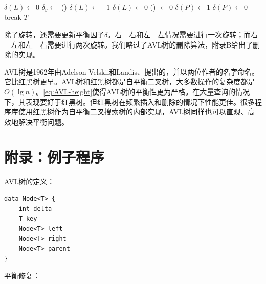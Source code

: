 \documentclass[b5paper]{ctexart}
\begin{document}
\begin{algorithmic}[1]
          \State $\delta(L) \gets 0$
          \State {}
        \Else {}
          \State $\delta_y \gets $ \textproc{$\delta$}()
            \State $\delta(L) \gets -1$
          \Else
            \State $\delta(L) \gets 0$
          \EndIf
          \State \textproc{$\delta$}() $\gets 0$
            \State $\delta(P) \gets 1$
          \Else
            \State $\delta(P) \gets 0$
          \EndIf
          \State {}
          \State {}
        \EndIf
      \EndIf
      \State break
    \EndIf
  \EndWhile
  \State \Return $T$
\EndFunction
\end{algorithmic}

除了旋转，还需要更新平衡因子$\delta$。右－右和左－左情况需要进行一次旋转；而右－左和左－右需要进行两次旋转。我们略过了AVL树的删除算法，附录B给出了删除的实现。

AVL树是1962年由Adelson-Velskii和Landis\cite{wiki-avl}、\cite{TFATP}提出的，并以两位作者的名字命名。它比红黑树更早。AVL树和红黑树都是自平衡二叉树，大多数操作的复杂度都是$O(\lg n)$。\cref{eq:AVL-height}使得AVL树的平衡性更为严格。在大量查询的情况下，其表现要好于红黑树\cite{wiki-avl}。但红黑树在频繁插入和删除的情况下性能更佳。很多程序库使用红黑树作为自平衡二叉搜索树的内部实现，AVL树同样也可以直观、高效地解决平衡问题。

\section{附录：例子程序}

AVL树的定义：

\begin{lstlisting}[language = Bourbaki]
data Node<T> {
    int delta
    T key
    Node<T> left
    Node<T> right
    Node<T> parent
}
\end{lstlisting}

平衡修复：
\end{document}
